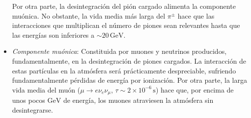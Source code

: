 \documentclass[11 pt, a4paper]{article} %
\numberwithin{equation}{section}
\numberwithin{figure}{section}
\numberwithin{table}{section}
\begin{document}
\begin{itemize}
Por otra parte, la desintegración del pión cargado alimenta la componente muónica. No obstante, la vida media más larga del $\pi^\pm$ hace que las interacciones que multiplican el número de piones sean relevantes hasta que las energías son inferiores a $\sim 20\,\mathrm{GeV}$.
	\item\textit{Componente muónica}: Constituida por muones y neutrinos producidos, fundamentalmente, en la desintegración de piones cargados. La interacción de estas partículas en la atmósfera será prácticamente despreciable, sufriendo fundamentalmente pérdidas de energía por ionización. Por otra parte, la larga vida media del muón ($\mu\rightarrow e\nu_e\nu_\mu$, $\tau\sim2\times10^{-6}\,\mathrm{s}$) hace que, por encima de unos pocos $\mathrm{GeV}$ de energía, los muones atraviesen la atmósfera sin desintegrarse.
\end{itemize}
\end{document}

